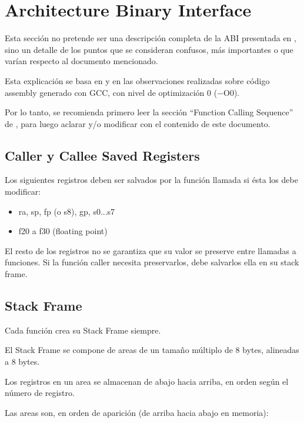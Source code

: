 \section{Architecture Binary Interface}
Esta sección no pretende ser una descripción completa de la ABI presentada en \cite{abi}, sino un detalle de los puntos que se consideran confusos, más importantes o que varían respecto al documento mencionado.

Esta explicación se basa en \cite{abi} y en las observaciones realizadas sobre código assembly generado con GCC, con nivel de optimización 0 (−O0).

Por lo tanto, se recomienda primero leer la sección “Function Calling Sequence” de \cite{abi}, para luego aclarar y/o modificar con el contenido de este documento.

\subsection{Caller y Callee Saved Registers}
Los siguientes registros deben ser salvados por la función llamada si ésta los debe modificar:

\begin{itemize}
 \item ra, sp, fp (o s8), gp, s0...s7
 \item f20 a f30 (floating point)
\end{itemize}

El resto de los registros no se garantiza que su valor se preserve entre llamadas a funciones. Si la función caller necesita preservarlos, debe salvarlos ella en su stack frame.

\subsection{Stack Frame}
Cada función crea su Stack Frame siempre.

El Stack Frame se compone de areas de un tamaño múltiplo de 8 bytes, alineadas a 8 bytes.

Los registros en un area se almacenan de abajo hacia arriba, en orden según el número de registro.

Las areas son, en orden de aparición (de arriba hacia abajo en memoria):

